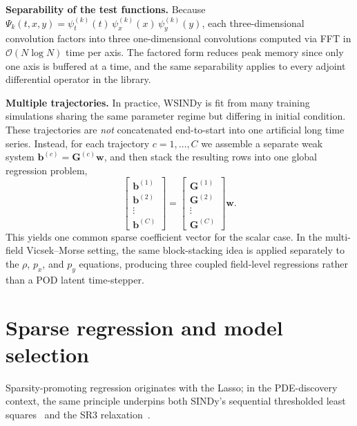 \noindent\textbf{Separability of the test functions.}
Because $\Psi_k(t,x,y)=\psi_t^{(k)}(t)\,\psi_x^{(k)}(x)\,\psi_y^{(k)}(y)$,
each three-dimensional convolution factors into three
one-dimensional convolutions computed via FFT in
$\mathcal{O}(N\log N)$ time per axis.  The factored form reduces peak memory
since only one axis is buffered at a time, and the same separability applies
to every adjoint differential operator in the library.

\noindent\textbf{Multiple trajectories.}
In practice, WSINDy is fit from many training simulations sharing the same
parameter regime but differing in initial condition.  These trajectories are
\emph{not} concatenated end-to-start into one artificial long time series.
Instead, for each trajectory $c=1,\dots,C$ we assemble a separate weak system
$\mathbf{b}^{(c)} = \mathbf{G}^{(c)}\mathbf{w}$,
and then stack the resulting rows into one global regression problem,
\begin{equation}
  \begin{bmatrix}
    \mathbf{b}^{(1)}\\
    \mathbf{b}^{(2)}\\
    \vdots\\
    \mathbf{b}^{(C)}
  \end{bmatrix}
  =
  \begin{bmatrix}
    \mathbf{G}^{(1)}\\
    \mathbf{G}^{(2)}\\
    \vdots\\
    \mathbf{G}^{(C)}
  \end{bmatrix}
  \mathbf{w}.
  \label{eq:stacked_weak_system}
\end{equation}
This yields one common sparse coefficient vector for the scalar case.  In the
multi-field Vicsek--Morse setting, the same block-stacking idea is applied
separately to the $\rho$, $p_x$, and $p_y$ equations, producing three coupled
field-level regressions rather than a POD latent time-stepper.

\section{Sparse regression and model selection}
\label{sec:regression}

Sparsity-promoting regression originates with the Lasso; in the PDE-discovery context, the same principle underpins both SINDy's sequential thresholded least squares~\cite{brunton2016sindy} and the SR3 relaxation~\cite{zheng2019sr3}.

